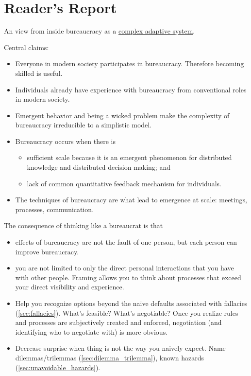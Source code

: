 \section{Reader's Report\label{sec:reader_report}}
An view from inside bureaucracy as a \href{https://en.wikipedia.org/wiki/Complexity_theory_and_organizations}{complex adaptive system}. 

Central claims:
\begin{itemize}
    \item Everyone in modern society participates in bureaucracy. Therefore becoming skilled is useful.
    \item Individuals already have experience with bureaucracy from conventional roles in modern society. 
    \item Emergent behavior and being a wicked problem make the complexity of bureaucracy irreducible to a simplistic model.
    \item Bureaucracy occurs when there is 
    \begin{itemize}
        \item sufficient scale because it is an emergent phenomenon for distributed knowledge and distributed decision making; and
        \item lack of common quantitative feedback mechanism for individuals.
    \end{itemize}
    \item The techniques of bureaucracy are what lead to emergence at scale: meetings, processes, communication. 
\end{itemize}
The consequence of thinking like a bureaucrat is that
\begin{itemize}
    \item effects of bureaucracy are not the fault of one person, but each person can improve bureaucracy.
    \item you are not limited to only the direct personal interactions that you have with other people. Framing allows you to think about processes that exceed your direct visibility and experience.
    \item Help you recognize options beyond the naive defaults associated with fallacies (\ref{sec:fallacies}). What's feasible? What's negotiable? Once you realize rules and processes are subjectively created and enforced, negotiation (and identifying who to negotiate with) is more obvious.
    \item Decrease surprise when thing is not the way you naively expect. Name dilemmas/trilemmas (\ref{sec:dilemma_trilemma}), known hazards (\ref{sec:unavoidable_hazards}).
\end{itemize}
